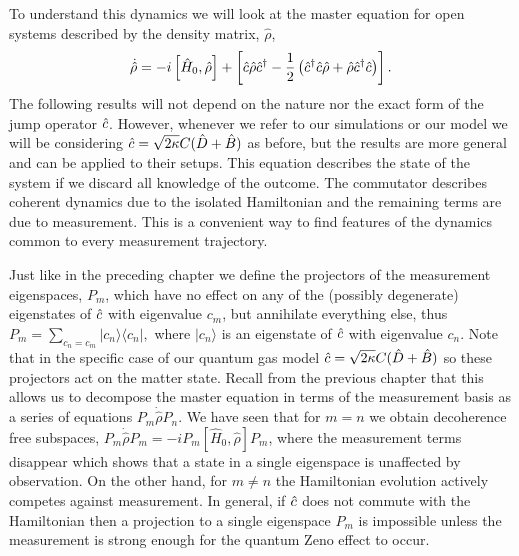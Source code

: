 To understand this dynamics we will look at the master equation for
open systems described by the density matrix, $\hat{\rho}$,
\begin{equation}
  \dot{\hat{\rho}} = -i \left[\hat{H}_0, \hat{\rho} \right] + 
  \left[ \hat{c} \hat{\rho} \hat{c}^\dagger - \frac{1}{2} \left( \hat{c}^\dagger \hat{c} \hat{\rho} + \hat{\rho}
      \hat{c}^\dagger \hat{c} \right) \right].
\end{equation}
The following results will not depend on the nature nor the exact form
of the jump operator $\hat{c}$. However, whenever we refer to our
simulations or our model we will be considering $\hat{c} = \sqrt{2 \kappa}
C(\hat{D} + \hat{B})$ as before, but the results are more general and can be
applied to their setups. This equation describes the state of the
system if we discard all knowledge of the outcome. The commutator
describes coherent dynamics due to the isolated Hamiltonian and the
remaining terms are due to measurement. This is a convenient way to
find features of the dynamics common to every measurement trajectory.

Just like in the preceding chapter we define the projectors of the
measurement eigenspaces, $P_m$, which have no effect on any of the
(possibly degenerate) eigenstates of $\hat{c}$ with eigenvalue $c_m$, but
annihilate everything else, thus
$P_m = \sum_{c_n = c_m} | c_n \rangle \langle c_n |,$ where
$| c_n \rangle$ is an eigenstate of $\hat{c}$ with eigenvalue $c_n$. Note
that in the specific case of our quantum gas model
$\hat{c} = \sqrt{2 \kappa} C(\hat{D} + \hat{B})$ so these projectors act on the
matter state. Recall from the previous chapter that this allows us to
decompose the master equation in terms of the measurement basis as a
series of equations $P_m \dot{\hat{\rho}} P_n$. We have seen that for
$m = n$ we obtain decoherence free subspaces,
$P_m \dot{\hat{\rho}} P_m = -i P_m \left[\hat{H}_0, \hat{\rho} \right]
P_m$, where the measurement terms disappear which shows that a state
in a single eigenspace is unaffected by observation. On the other
hand, for $m \ne n$ the Hamiltonian evolution actively competes
against measurement. In general, if $\hat{c}$ does not commute with the
Hamiltonian then a projection to a single eigenspace $P_m$ is
impossible unless the measurement is strong enough for the quantum
Zeno effect to occur.

